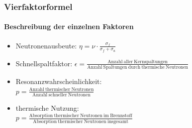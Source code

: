 \documentclass{beamer}[9pt]
\begin{document}
\begin{frame}
\frametitle{Vierfaktorformel}
\framesubtitle{Beschreibung der einzelnen Faktoren}
\begin{itemize}
\item Neutronenausbeute: 
$
\eta = \nu \cdot \frac{\sigma_f}{\sigma_f+ \sigma_a}
$
\vspace{1em}

\item Schnellspaltfaktor: 
$\epsilon = \frac{\mathrm{Anzahl\ aller\ Kernspaltungen}}{\mathrm{Anzahl\ Spaltungen\ durch\ thermische\ Neutronen}}
$
\vspace{1em}
\item Resonanzwahrscheinlichkeit:\\
$
p = \frac{\mathrm{Anzahl\ thermischer\ Neutronen}}{\mathrm{Anzahl\ schneller\ Neutronen}}
$
\vspace{1em}
\item thermische Nutzung:\\
$
p = \frac{\mathrm{Absorption\ thermischer\ Neutronen\ im\ Brennstoff}}{\mathrm{Absorption\ thermischer\ Neutronen\ insgesamt}}
$
\end{itemize}
\end{frame}
\end{document}
